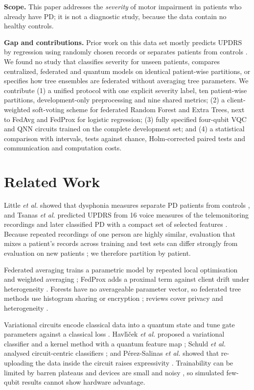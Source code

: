 \documentclass[conference,a4paper]{IEEEtran}
\begin{document}
\textbf{Scope.} This paper addresses the \textit{severity} of motor impairment in patients who already have PD; it is not a diagnostic study, because the data contain no healthy controls.

\textbf{Gap and contributions.} Prior work on this data set mostly predicts UPDRS by regression using randomly chosen records \cite{tsanas2010} or separates patients from controls \cite{tsanas2012}. We found no study that classifies severity for unseen patients, compares centralized, federated and quantum models on identical patient-wise partitions, or specifies how tree ensembles are federated without averaging tree parameters. We contribute (1) a unified protocol with one explicit severity label, ten patient-wise partitions, development-only preprocessing and nine shared metrics; (2) a client-weighted soft-voting scheme for federated Random Forest and Extra Trees, next to FedAvg and FedProx for logistic regression; (3) fully specified four-qubit VQC and QNN circuits trained on the complete development set; and (4) a statistical comparison with intervals, tests against chance, Holm-corrected paired tests and communication and computation costs.

\section{Related Work}
Little \textit{et al.} showed that dysphonia measures separate PD patients from controls \cite{little2009}, and Tsanas \textit{et al.} predicted UPDRS from 16 voice measures of the telemonitoring recordings \cite{tsanas2010} and later classified PD with a compact set of selected features \cite{tsanas2012}. Because repeated recordings of one person are highly similar, evaluation that mixes a patient's records across training and test sets can differ strongly from evaluation on new patients \cite{saeb2017}; we therefore partition by patient.

Federated averaging trains a parametric model by repeated local optimisation and weighted averaging \cite{mcmahan2017}; FedProx adds a proximal term against client drift under heterogeneity \cite{li2020prox}. Forests have no averageable parameter vector, so federated tree methods use histogram sharing or encryption \cite{li2020gbdt,cheng2021}; reviews cover privacy and heterogeneity \cite{kairouz2021}.

Variational circuits encode classical data into a quantum state and tune gate parameters against a classical loss \cite{mitarai2018,cerezo2021}. Havl\'{\i}\v{c}ek \textit{et al.} proposed a variational classifier and a kernel method with a quantum feature map \cite{havlicek2019}; Schuld \textit{et al.} analysed circuit-centric classifiers \cite{schuld2020}; and P\'erez-Salinas \textit{et al.} showed that re-uploading the data inside the circuit raises expressivity \cite{perez2020}. Trainability can be limited by barren plateaus \cite{mcclean2018} and devices are small and noisy \cite{preskill2018}, so simulated few-qubit results cannot show hardware advantage.
\end{document}
